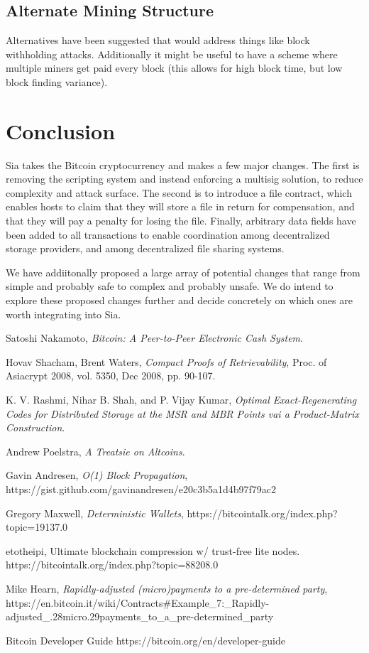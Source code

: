 \documentclass[twocolumn]{article}
\begin{document}
\subsection{Alternate Mining Structure}
Alternatives have been suggested that would address things like block withholding attacks.
Additionally it might be useful to have a scheme where multiple miners get paid every block (this allows for high block time, but low block finding variance).

\section{Conclusion}
Sia takes the Bitcoin cryptocurrency and makes a few major changes.
The first is removing the scripting system and instead enforcing a multisig solution, to reduce complexity and attack surface.
The second is to introduce a file contract, which enables hosts to claim that they will store a file in return for compensation, and that they will pay a penalty for losing the file.
Finally, arbitrary data fields have been added to all transactions to enable coordination among decentralized storage providers, and among decentralized file sharing systems.

We have addiitonally proposed a large array of potential changes that range from simple and probably safe to complex and probably unsafe.
We do intend to explore these proposed changes further and decide concretely on which ones are worth integrating into Sia.

\onecolumn
\begin{thebibliography}{9}

	Satoshi Nakamoto,
	\emph{Bitcoin: A Peer-to-Peer Electronic Cash System}.

	Hovav Shacham, Brent Waters,
	\emph{Compact Proofs of Retrievability},
	Proc. of Asiacrypt 2008, vol. 5350, Dec 2008, pp. 90-107.

	K. V. Rashmi, Nihar B. Shah, and P. Vijay Kumar,
	\emph{Optimal Exact-Regenerating Codes for Distributed Storage at the MSR and MBR Points vai a Product-Matrix Construction}.

	Andrew Poelstra,
	\emph{A Treatsie on Altcoins}.

	Gavin Andresen,
	\emph{O(1) Block Propagation},
	https://gist.github.com/gavinandresen/e20c3b5a1d4b97f79ac2

	Gregory Maxwell,
	\emph{Deterministic Wallets},
	https://bitcointalk.org/index.php?topic=19137.0

	etotheipi,
	Ultimate blockchain compression w/ trust-free lite nodes.
	https://bitcointalk.org/index.php?topic=88208.0

	Mike Hearn,
	\emph{Rapidly-adjusted (micro)payments to a pre-determined party},
	https://en.bitcoin.it/wiki/Contracts\#Example\_7:\_Rapidly-adjusted\_.28micro.29payments\_to\_a\_pre-determined\_party

	Bitcoin Developer Guide
	https://bitcoin.org/en/developer-guide


\end{thebibliography}
\end{document}
